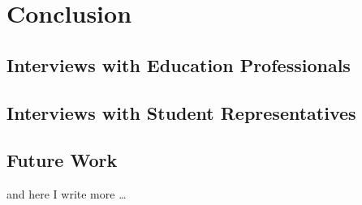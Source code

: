\chapter{Conclusion}

\section{Interviews with Education Professionals}

\section{Interviews with Student Representatives}

\section{Future Work}
and here I write more \dots

